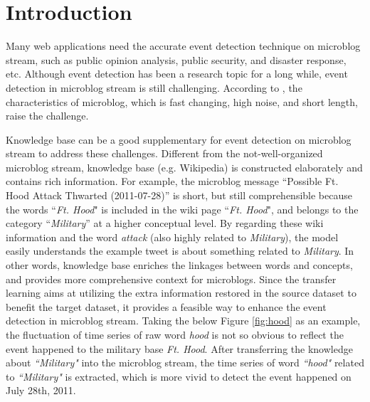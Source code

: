 \documentclass[runningheads,a4paper]{llncs}
\theoremstyle{exampstyle}
\begin{document}
\section{Introduction}
Many web applications need the accurate event detection technique on microblog stream, such as public opinion analysis\cite{thelwall2011sentiment}, public security\cite{Li:2012gw}, and disaster response\cite{Yin:2012ht}, etc.
Although event detection has been a research topic for a long while\cite{allan1998topic}, event detection in microblog stream is still challenging\cite{atefeh2015survey}.
According to \cite{huang2016probabilistic}, the characteristics of microblog, which is fast changing, high noise, and short length, raise the challenge.

Knowledge base can be a good supplementary for event detection on microblog stream to address these challenges.
Different from the not-well-organized microblog stream, knowledge base (e.g. Wikipedia) is constructed elaborately and contains rich information. 
For example, the microblog message ``Possible Ft. Hood Attack Thwarted (2011-07-28)'' is short, but still comprehensible because the words ``\textit{Ft. Hood}" is included in the wiki page ``\textit{Ft. Hood}", and belongs to the category ``\textit{Military}'' at a higher conceptual level.
By regarding these wiki information and the word \textit{attack} (also highly related to \textit{Military}), the model easily understands the example tweet is about something related to \textit{Military}.
In other words, knowledge base enriches the linkages between words and concepts, and provides more comprehensive context for microblogs.
Since the transfer learning\cite{pan2010survey} aims at utilizing the extra information restored in the source dataset to benefit the target dataset, it provides a feasible way to enhance the event detection in microblog stream.
Taking the below Figure \ref{fig:hood} as an example, the fluctuation of time series of raw word \textit{hood} is not so obvious to reflect the event happened to the military base \textit{Ft. Hood}.
After transferring the knowledge about \textit{``Military"} into the microblog stream, the time series of word \textit{``hood"} related to \textit{``Military"} is extracted, which is more vivid to detect the event happened on July 28th, 2011.
\end{document}
